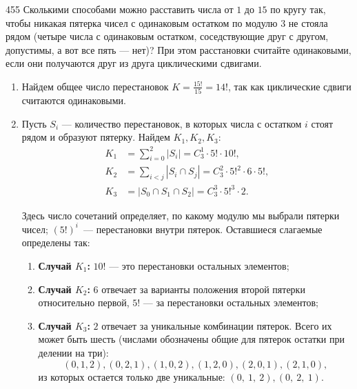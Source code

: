 \begin{task}{455}
Сколькими способами можно расставить числа от \(1\) до \(15\) по кругу так, чтобы никакая пятерка чисел с одинаковым остатком по модулю \(3\) не стояла рядом (четыре числа с одинаковым остатком, соседствующие друг с другом, допустимы, а вот все пять — нет)? При этом расстановки считайте одинаковыми, если они получаются друг из друга циклическими сдвигами.
\end{task}

\begin{solution}

\begin{enumerate}
    \item Найдем общее число перестановок $\displaystyle K = \frac{15!}{15} = 14!$, так как циклические сдвиги считаются одинаковыми.
    
    \item Пусть $S_i$ --- количество перестановок, в которых числа с остатком $i$ стоят рядом и образуют пятерку. Найдем $K_1, K_2, K_3$:
    \begin{align*}
        K_1 &= \sum_{i=0}^{2} |S_i| = C_3^1 \cdot 5! \cdot 10!, \\
        K_2 &= \sum_{i<j} |S_i \cap S_j| = C_3^2 \cdot 5!^2 \cdot 6 \cdot 5!, \\
        K_3 &= |S_0 \cap S_1 \cap S_2| = C_3^3 \cdot 5!^3 \cdot 2.
    \end{align*}
    
    Здесь число сочетаний определяет, по какому модулю мы выбрали пятерки чисел; $(5!)^i$~--- перестановки внутри пятерок. Оставшиеся слагаемые определены так:
    \begin{enumerate}
        \item \textbf{Случай $K_1$:} $10!$ --- это перестановки остальных элементов;
        
        \item \textbf{Случай $K_2$:} \(6\) отвечает за варианты положения второй пятерки относительно первой, $5!$ --- за перестановки остальных элементов;
        
        \item \textbf{Случай $K_3$:} \(2\) отвечает за уникальные комбинации пятерок. Всего их может быть шесть (числами обозначены общие для пятерок остатки при делении на три):
        \begin{equation*}
            (0, 1, 2), (0, 2, 1), (1, 0, 2), (1, 2, 0), (2, 0, 1), (2, 1, 0),
        \end{equation*}
        из которых остается только две уникальные: $(0,~1,~2), (0,~2,~1)$.
    \end{enumerate}
    

\end{enumerate}
\end{solution}
